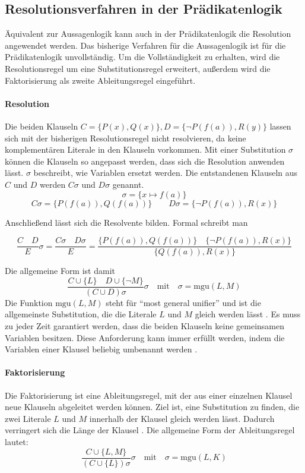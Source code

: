 		\subsection{Resolutionsverfahren in der Prädikatenlogik}
Äquivalent zur Aussagenlogik kann auch in der Prädikatenlogik die Resolution angewendet werden. Das bisherige Verfahren für die Aussagenlogik ist für die Prädikatenlogik unvollständig. Um die Vollständigkeit zu erhalten, wird die Resolutionsregel um eine Substitutionsregel erweitert, außerdem wird die Faktorisierung als zweite Ableitungsregel eingeführt. \cite{Chang1973Symb}
\paragraph{Resolution}
Die beiden Klauseln $C=\{P(x), Q(x)\}, D=\{\neg P(f(a)), R(y)\}$ lassen sich mit der bisherigen Resolutionsregel nicht resolvieren, da keine komplementären Literale in den Klauseln vorkommen.
Mit einer Substitution $\sigma$ können die Klauseln so angepasst werden, dass sich die Resolution anwenden lässt. $\sigma$ beschreibt, wie Variablen ersetzt werden. Die entstandenen Klauseln aus $C$ und $D$ werden $C\sigma$ und $D\sigma$ genannt.
$$\sigma=\{x \mapsto f(a)\}$$
$$C\sigma=\{P(f(a)), Q(f(a))\} \quad\quad D\sigma=\{\neg P(f(a)), R(x)\} $$

Anschließend lässt sich die Resolvente bilden. Formal schreibt man

$$\frac{C \quad D}{E}\sigma = \frac{C\sigma \quad D\sigma}{E}= \frac{\{P(f(a)), Q(f(a))\} \quad \{\neg P(f(a)), R(x)\}}{\{Q(f(a)), R(x)\}}$$

Die allgemeine Form ist damit
$$\frac{C \cup \{L\} \quad D \cup \{\neg M\}}{(C \cup D)\sigma} \sigma \quad\text{mit}\quad \sigma=\text{mgu}(L, M)$$
Die Funktion $\text{mgu}(L, M)$ steht für "`most general unifier"' und ist die allgemeinste Substitution, die die Literale $L$ und $M$ gleich werden lässt \cite{Haifani2021Sos}.
Es muss zu jeder Zeit garantiert werden, dass die beiden Klauseln keine gemeinsamen Variablen besitzen. Diese Anforderung kann immer erfüllt werden, indem die Variablen einer Klausel beliebig umbenannt werden \cite{Hoffmann2008TI}.
\paragraph{Faktorisierung}
Die Faktorisierung ist eine Ableitungsregel, mit der aus einer einzelnen Klausel neue Klauseln abgeleitet werden können. Ziel ist, eine Substitution zu finden, die zwei Literale $L$ und $M$ innerhalb der Klausel gleich werden lässt. Dadurch verringert sich die Länge der Klausel \cite{Chang1973Symb}.
Die allgemeine Form der Ableitungsregel lautet:
$$\frac{C \cup \{L,M\}}{(C \cup \{L\})\sigma}\sigma \quad\text{mit}\quad\sigma=\text{mgu}(L,K)$$
	
